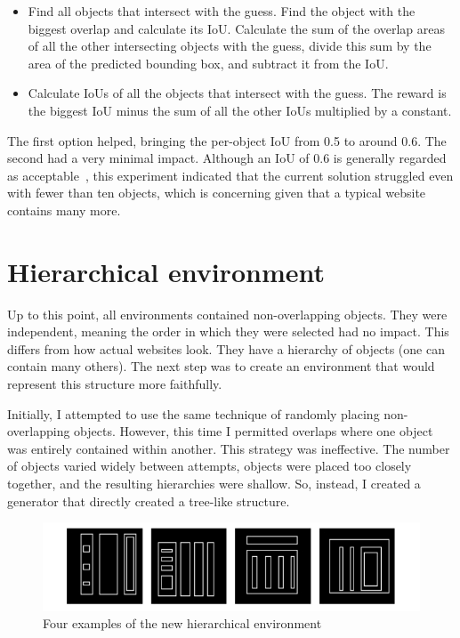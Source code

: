 \documentclass[
  digital,     %
  oneside,     %
  nosansbold,  %
  nocolorbold, %
  lof,         %
  lot,         %
]{fithesis4}
\begin{document}
\begin{itemize}
    \item Find all objects that intersect with the guess. Find the object with the biggest overlap and calculate its IoU. Calculate the sum of the overlap areas of all the other intersecting objects with the guess, divide this sum by the area of the predicted bounding box, and subtract it from the IoU.
    \item Calculate IoUs of all the objects that intersect with the guess. The reward is the biggest IoU minus the sum of all the other IoUs multiplied by a constant.
\end{itemize}

The first option helped, bringing the per-object IoU from 0.5 to around 0.6. The second had a very minimal impact. Although an IoU of 0.6 is generally regarded as acceptable~\cite{DLforVisualSystems}, this experiment indicated that the current solution struggled even with fewer than ten objects, which is concerning given that a typical website contains many more.

\section{Hierarchical environment}
\label{sec:hierarchical-env}

Up to this point, all environments contained non-overlapping objects. They were independent, meaning the order in which they were selected had no impact. This differs from how actual websites look. They have a hierarchy of objects (one can contain many others). The next step was to create an environment that would represent this structure more faithfully.

Initially, I attempted to use the same technique of randomly placing non-overlapping objects. However, this time I permitted overlaps where one object was entirely contained within another. This strategy was ineffective. The number of objects varied widely between attempts, objects were placed too closely together, and the resulting hierarchies were shallow. So, instead, I created a generator that directly created a tree-like structure.

\begin{figure}[h]
    \centering
    \includegraphics[width=1\linewidth]{env_examples/env7.pdf}
    \caption{Four examples of the new hierarchical environment}
    \label{fig:env7}
\end{figure}
\end{document}
